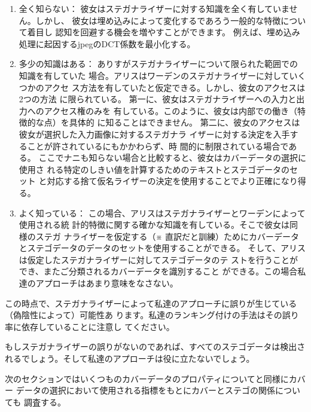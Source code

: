 \documentclass[a4j,fleqn,10pt]{jsarticle}
\begin{document}
\begin{enumerate}
 \item 全く知らない：
       彼女はステガナライザーに対する知識を全く有していません。しかし、
       彼女は埋め込みによって変化するであろう一般的な特徴について着目し
       認知を回避する機会を増やすことができます。
       例えば、埋め込み処理に起因するjpegのDCT係数を最小化する。

 \item 多少の知識はある：
       ありすがステガナライザーについて限られた範囲での知識を有していた
       場合。アリスはワーデンのステガナライザーに対していくつかのアクセ
       ス方法を有していたと仮定できる。しかし、彼女のアクセスは2つの方法
       に限られている。
       第一に、彼女はステガナライザーへの入力と出力へのアクセス権のみを
       有している。このように、彼女は内部での働き（特徴的な点）を具体的
       に知ることはできません。
       第二に、彼女のアクセスは彼女が選択した入力画像に対するステガナラ
       イザーに対する決定を入手することが許されているにもかかわらず、時
       間的に制限されている場合である。
       ここでナニも知らない場合と比較すると、彼女はカバーデータの選択に使用さ
       れる特定のしきい値を計算するためのテキストとステゴデータのセット
       と対応する捨て仮名ライザーの決定を使用することでより正確になり得
       る。

 \item よく知っている：
       この場合、アリスはステガナライザーとワーデンによって使用される統
       計的特徴に関する確かな知識を有している。そこで彼女は同様のステガ
       ナライザーを仮定する（※ 直訳だと訓練）ためにカバーデータ
       とステゴデータのデータのセットを使用することができる。
       そして、アリスは仮定したステガナライザーに対してステゴデータのテ
       ストを行うことができ、またご分類されるカバーデータを識別すること
       ができる。この場合私達のアプローチはあまり意味をなさない。
\end{enumerate}

この時点で、ステガナライザーによって私達のアプローチに誤りが生じている（偽陰性によって）可能性あ
ります。私達のランキング付けの手法はその誤り率に依存していることに注意し
てください。

もしステガナライザーの誤りがないのであれば、すべてのステゴデータは検出さ
れるでしょう。そして私達のアプローチは役に立たないでしょう。

次のセクションではいくつものカバーデータのプロパティについてと同様にカバー
データの選択において使用される指標をもとにカバーとステゴの関係についても
調査する。
\end{document}
